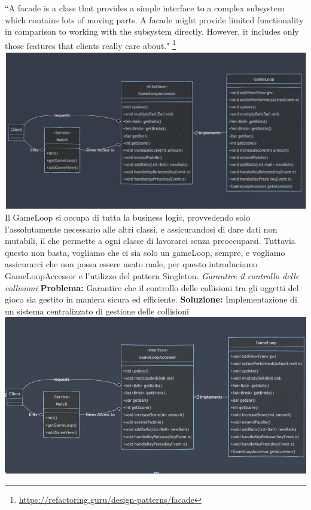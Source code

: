 \documentclass[a4paper,12pt]{report}
\begin{document}
``A facade is a class that provides a simple interface to a complex subsystem which contains lots of moving parts. A facade might provide limited functionality in comparison to working with the subsystem directly. However, it includes only those features that clients really care about."
\footnote{\href{https://refactoring.guru/design-patterns/facade}{https://refactoring.guru/design-patterns/facade}}
\includegraphics[width=\textwidth]{gameLoop.png}
Il GameLoop si occupa di tutta la business logic, provvedendo solo l’assolutamente necessario alle altri classi, e assicurandosi di dare dati non mutabili, il che permette a ogni classe di lavorarci senza preoccuparsi. Tuttavia questo non basta, vogliamo che ci sia solo un gameLoop, sempre, e vogliamo assicurarci che non possa essere usato male, per questo introduciamo GameLoopAccessor e l’utilizzo del pattern Singleton.
\newline
\newline
\textit{Garantire il controllo delle collisioni}\newline\newline
\textbf{Problema:} Garantire che il controllo delle collisioni tra gli oggetti del gioco sia gestito in maniera sicura ed efficiente.\newline
\textbf{Soluzione:} Implementazione di un sistema centralizzato di gestione delle collisioni \newline
\includegraphics[width=\textwidth]{facadeSingleton.png}
\end{document}
